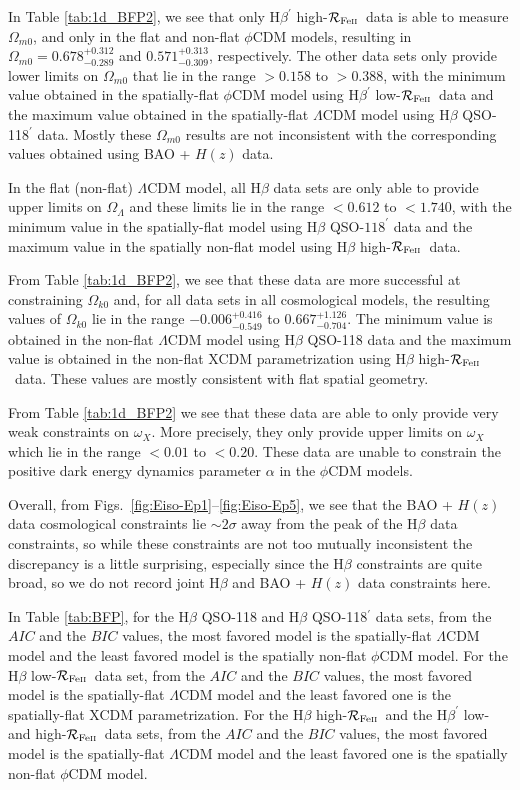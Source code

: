 \documentclass[a4paper,fleqn,usenatbib]{mnras}
\newcommand{\rfe}{${\cal R}_{\rm{Fe\textsc{ii}}}$}
\begin{document}
In Table \ref{tab:1d_BFP2}, we see that only H$\beta^{\prime}$ high-\rfe\ data is able to measure $\Omega_{m0}$, and only in the flat and non-flat $\phi$CDM models, resulting in  $\Omega_{m0} = 0.678^{+0.312}_{-0.289}$ and $0.571^{+0.313}_{-0.309}$, respectively. The other data sets only provide lower limits on $\Omega_{m0}$ that lie in the range  $> 0.158$ to $> 0.388$, with the minimum value obtained in the spatially-flat $\phi$CDM model using H$\beta^{\prime}$ low-\rfe\ data and the maximum value obtained in the spatially-flat $\Lambda$CDM model using H$\beta$ QSO-118$^{\prime}$ data. Mostly these $\Omega_{m0}$ results are not inconsistent with the corresponding values obtained using BAO + $H(z)$ data.

In the flat (non-flat) $\Lambda$CDM model, all H$\beta$ data sets are only able to provide upper limits on $\Omega_{\Lambda}$ and these limits lie in the range $< 0.612$ to $< 1.740$, with the minimum value in the spatially-flat model using H$\beta$ QSO-$118^{\prime}$ data and the maximum value in the spatially non-flat model using H$\beta$ high-\rfe\ data.

From Table \ref{tab:1d_BFP2}, we see that these data are more successful at constraining $\Omega_{k0}$ and, for all data sets in all cosmological models, the resulting values of $\Omega_{k0}$ lie in the range $-0.006^{+0.416}_{-0.549}$ to $0.667^{+1.126}_{-0.704}$. The minimum value is obtained in the non-flat $\Lambda$CDM model using H$\beta$ QSO-118 data and the maximum value is obtained in the non-flat XCDM parametrization using H$\beta$ high-\rfe\ data. These values are mostly consistent with flat spatial geometry.

From Table \ref{tab:1d_BFP2} we see that these data are able to only provide very weak constraints on $\omega_X$. More precisely, they only provide upper limits on $\omega_X$ which lie in the range $< 0.01$ to $< 0.20$. These data are unable to constrain the positive dark energy dynamics parameter $\alpha$ in the $\phi$CDM models.

Overall, from Figs.\ \ref{fig:Eiso-Ep1}--\ref{fig:Eiso-Ep5}, we see that the BAO + $H(z)$ data cosmological constraints lie $\sim2\sigma$ away from the peak of the H$\beta$ data constraints, so while these constraints are not too mutually inconsistent the discrepancy is a little surprising, especially since the H$\beta$ constraints are quite broad, so we do not record joint H$\beta$ and BAO + $H(z)$ data constraints here.  

In Table \ref{tab:BFP}, for the H$\beta$ QSO-118 and H$\beta$ QSO-118$^{\prime}$ data sets, from the $AIC$ and the $BIC$ values, the most favored model is the spatially-flat $\Lambda$CDM model and the least favored model is the spatially non-flat $\phi$CDM model. For the H$\beta$ low-\rfe\ data set, from the $AIC$ and the $BIC$ values, the most favored model is the spatially-flat $\Lambda$CDM model and the least favored one is the spatially-flat XCDM parametrization. For the H$\beta$ high-\rfe\, and the H$\beta^{\prime}$ low- and high-\rfe\ data sets, from the $AIC$ and the $BIC$ values, the most favored model is the spatially-flat $\Lambda$CDM model and the least favored one is the spatially non-flat $\phi$CDM model. 
\end{document}

